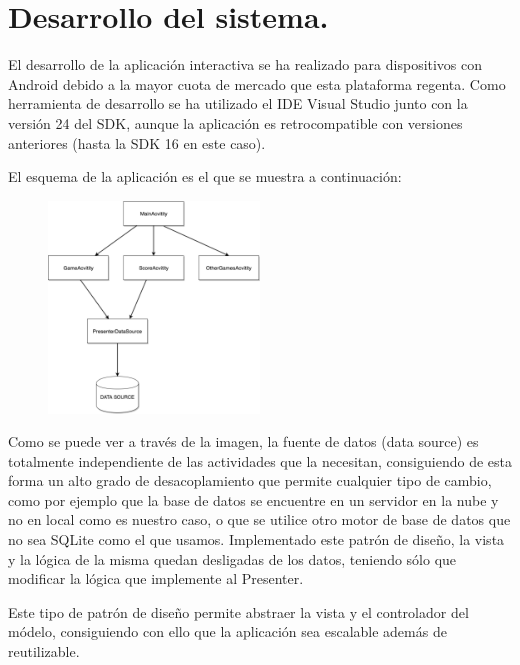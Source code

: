 \documentclass[10pt]{article}
\begin{document}
\section{Desarrollo del sistema.}

El desarrollo de la aplicación interactiva se ha realizado para dispositivos con Android debido a la mayor cuota de mercado que esta plataforma regenta. Como herramienta de desarrollo se ha utilizado el IDE Visual Studio junto con la versión 24 del SDK, aunque la aplicación es retrocompatible con versiones anteriores (hasta la SDK 16 en este caso).

El esquema de la aplicación es el que se muestra a continuación:



\begin{figure}[H]
	\begin{center}
 		\includegraphics[width = 0.5\textwidth]{Imagenes/arquitectura.eps}
	\end{center} 
\end{figure}

Como se puede ver a través de la imagen, la fuente de datos (data source) es totalmente independiente de las actividades que la necesitan, consiguiendo de esta forma un alto grado de desacoplamiento que permite cualquier tipo de cambio, como por ejemplo que la base de datos se encuentre en un servidor en la nube y no en local como es nuestro caso, o que se utilice otro motor de base de datos que no sea SQLite como el que usamos. Implementado este patrón de diseño, la vista y la lógica de la misma quedan desligadas de los datos, teniendo sólo que modificar la lógica que implemente al Presenter. 

Este tipo de patrón de diseño permite abstraer la vista y el controlador del módelo, consiguiendo con ello que la aplicación sea escalable además de reutilizable.
\end{document}

